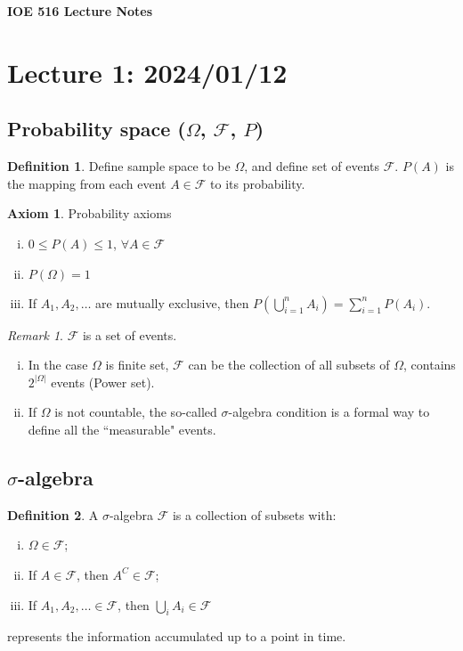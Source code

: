 \documentclass[11pt]{article}
\theoremstyle{definition}
\newtheorem{definition}{Definition}[section]
\newtheorem{axiom}{Axiom}[section]
\theoremstyle{remark}
\newtheorem*{remark}{Remark}
\begin{document}
\begin{center}
\textbf{IOE 516 Lecture Notes}
\end{center}

\section{Lecture 1: 2024/01/12}
\subsection{Probability space ($\Omega$, $\mathcal{F}$, $P$)}
    \begin{definition}
        Define sample space to be $\Omega$, and define set of events $\mathcal{F}$. $P(A)$ is the mapping from each event $A \in \mathcal{F}$ to its probability.
    \end{definition}
    \begin{axiom}{Probability axioms}
        \begin{enumerate}[(i)]
            \item $0 \leq P(A) \leq 1$, $\forall A \in \mathcal{F}$
            \item $P(\Omega) = 1$
            \item If $A_1, A_2, \dots$ are mutually exclusive, then $P(\bigcup_{i=1}^n A_i) = \sum_{i=1}^n P(A_i)$.
        \end{enumerate}
    \end{axiom}
    \begin{remark}
        $\mathcal{F}$ is a set of events.
        \begin{enumerate}[(i)]
            \item In the case $\Omega$ is finite set, $\mathcal{F}$ can be the collection of all subsets of $\Omega$, contains $2^{|\Omega|}$ events (Power set).
            \item If $\Omega$ is not countable, the so-called $\sigma$-algebra condition is a formal way to define all the ``measurable" events.
        \end{enumerate}
    \end{remark}
\subsection{$\sigma$-algebra}
    \begin{definition}
    A $\sigma$-algebra $\mathcal{F}$ is a collection of subsets with: \begin{enumerate}[(i)]
        \item $\Omega \in \mathcal{F}$;
        \item If $A \in \mathcal{F}$, then $A^C \in \mathcal{F}$;
        \item If $A_1, A_2, \dots \in \mathcal{F}$, then $\bigcup_{i}A_i \in \mathcal{F}$ 
    \end{enumerate}
    represents the information accumulated up to a point in time.
    \end{definition}
\end{document}
